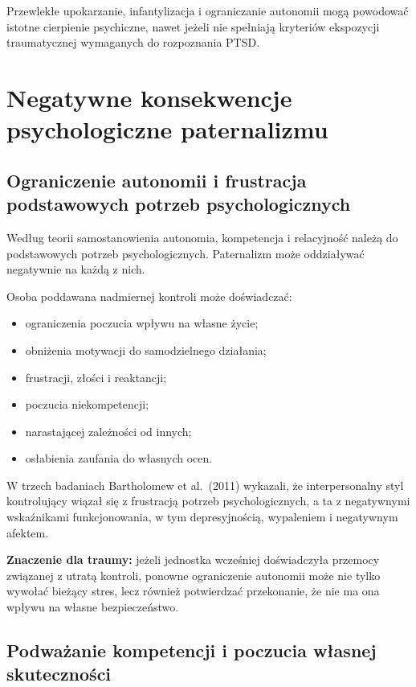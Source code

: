 \documentclass[11pt,a4paper,oneside,headinclude=true,footinclude=false]{scrartcl}
\providecommand{\tightlist}{\setlength{\itemsep}{3pt}\setlength{\parskip}{0pt}}
\begin{document}
Przewlekłe upokarzanie, infantylizacja i ograniczanie autonomii mogą
powodować istotne cierpienie psychiczne, nawet jeżeli nie spełniają
kryteriów ekspozycji traumatycznej wymaganych do rozpoznania PTSD.

\section{Negatywne konsekwencje psychologiczne paternalizmu}\label{sec:3}

\subsection{Ograniczenie autonomii i frustracja podstawowych potrzeb psychologicznych}\label{subsec:3.1}

Według teorii samostanowienia autonomia, kompetencja i relacyjność
należą do podstawowych potrzeb psychologicznych. Paternalizm może
oddziaływać negatywnie na każdą z nich.

Osoba poddawana nadmiernej kontroli może doświadczać:

\begin{itemize}
\tightlist
\item
  ograniczenia poczucia wpływu na własne życie;
\item
  obniżenia motywacji do samodzielnego działania;
\item
  frustracji, złości i reaktancji;
\item
  poczucia niekompetencji;
\item
  narastającej zależności od innych;
\item
  osłabienia zaufania do własnych ocen.
\end{itemize}

W trzech badaniach Bartholomew et al.~(2011) wykazali, że
interpersonalny styl kontrolujący wiązał się z frustracją potrzeb
psychologicznych, a ta z negatywnymi wskaźnikami funkcjonowania, w tym
depresyjnością, wypaleniem i negatywnym afektem.

\textbf{Znaczenie dla traumy:} jeżeli jednostka wcześniej doświadczyła
przemocy związanej z utratą kontroli, ponowne ograniczenie autonomii
może nie tylko wywołać bieżący stres, lecz również potwierdzać
przekonanie, że nie ma ona wpływu na własne bezpieczeństwo.

\subsection{Podważanie kompetencji i poczucia własnej skuteczności}\label{subsec:3.2}
\end{document}
